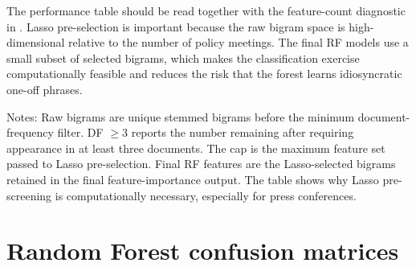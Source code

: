 The performance table should be read together with the feature-count diagnostic
in . Lasso pre-selection is important because the
raw bigram space is high-dimensional relative to the number of policy meetings.
The final RF models use a small subset of selected bigrams, which makes the
classification exercise computationally feasible and reduces the risk that the
forest learns idiosyncratic one-off phrases.


\begin{table}[H]
\centering
\caption{Random Forest feature-count diagnostics}
\label{tab:a3_rf_feature_counts}
\begin{threeparttable}
\scriptsize
{}
\begin{tablenotes}
\footnotesize
\item Notes: Raw bigrams are unique stemmed bigrams before the minimum document-frequency filter. DF $\geq 3$ reports the number remaining after requiring appearance in at least three documents. The cap is the maximum feature set passed to Lasso pre-selection. Final RF features are the Lasso-selected bigrams retained in the final feature-importance output. The table shows why Lasso pre-screening is computationally necessary, especially for press conferences.
\end{tablenotes}
\end{threeparttable}
\end{table}


\section{Random Forest confusion matrices}
\label{app:a3_rf_confusion}

